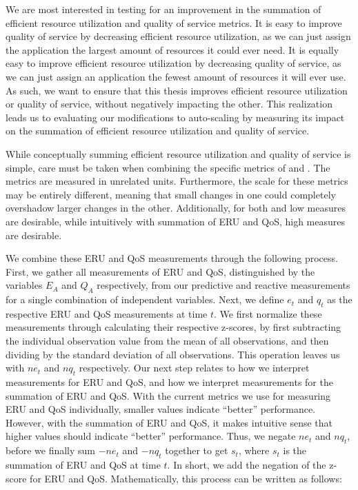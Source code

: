 We are most interested in testing for an improvement in the summation of
efficient resource utilization and quality of service metrics. It is
easy to improve quality of service by decreasing efficient resource
utilization, as we can just assign the application the largest amount of
resources it could ever need. It is equally easy to improve efficient resource
utilization by decreasing quality of service, as we can just assign an
application the fewest amount of resources it will ever use. As such, we want to
ensure that this thesis improves efficient resource utilization or quality of
service, without negatively impacting the other. This realization leads us to
evaluating our modifications to auto-scaling by measuring its impact on the
summation of efficient resource utilization and quality of service.

While conceptually summing efficient resource utilization and quality of service
is simple, care must be taken when combining the specific metrics of
 and . The metrics are measured in unrelated
units. Furthermore, the scale for these metrics may be entirely different,
meaning that small changes in one could completely overshadow larger changes in
the other. Additionally, for both  and  low
measures are desirable, while intuitively with summation of ERU and QoS, high
measures are desirable.

We combine these ERU and QoS measurements through the following process.
First, we gather all measurements of ERU and QoS,
distinguished by the variables $E_{A}$ and $Q_{A}$ respectively, from our
predictive and reactive measurements for a single combination of independent
variables. Next, we define $e_{t}$ and $q_{t}$ as the
respective ERU and QoS measurements at time $t$. We first
normalize these measurements through calculating their respective z-scores,
by first subtracting the individual observation value
from the mean of all observations, and then dividing by the standard deviation of all
observations. This operation leaves us with $ne_{t}$ and $nq_{t}$ respectively.
Our next step relates to how we interpret measurements for ERU and QoS, and how
we interpret measurements for the summation of ERU and QoS. With the current
metrics we use for measuring ERU and QoS individually, smaller values indicate
``better'' performance. However, with the summation of ERU and QoS, it makes
intuitive sense that higher values should indicate ``better'' performance.
Thus, we negate $ne_{t}$ and $nq_{t}$, before we finally sum
$-ne_{t}$ and $-nq_{t}$ together to get $s_{t}$, where $s_{t}$ is the summation
of ERU and QoS at time $t$.
In short, we add the negation of the z-score for
ERU and QoS. Mathematically, this process can be written as
follows:

